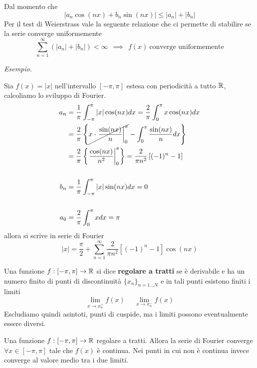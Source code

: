 \begin{rem}
Dal momento che
\begin{equation*}
| a_{n}\cos(nx) + b_{n}\sin(nx)| \leq | a_{n}| + | b_{n}|
\end{equation*}
Per il test di Weierstrass vale la seguente relazione che ci permette di stabilire se la serie converge uniformemente
\begin{equation*}
\sum\limits^{\infty}_{n = 1}(| a_{n}| + | b_{n}|) < \infty \ \ \implies \ \ f(x) \ \text{converge uniformemente}
\end{equation*}
\end{rem}
\textit{Esempio.}

Sia $f(x) = | x| $ nell'intervallo $[ - \pi, \pi]$ estesa con periodicità a tutto $\mathbb{R}$, calcoliamo lo sviluppo di Fourier.
\begin{align*}
a_{n} & = \frac{1}{\pi}\int^{\pi}_{- \pi}| x| \cos(nx) dx = \frac{2}{\pi}\int^{\pi}_{0} x\cos(nx) dx\\
 & = \frac{2}{\pi}\left\{\cancel{x \cdot \left. \frac{\sin(nx)}{n}\right|^{\pi}_{0}} - \int^{\pi}_{0}\frac{\sin(nx)}{n} dx\right\}\\
 & = \frac{2}{\pi}\left\{\left. \frac{\cos(nx)}{n^{2}}\right|^{\pi}_{0}\right\} = \frac{2}{\pi n^{2}}\left[(- 1)^{n} - 1\right]\\
 & \\
b_{n} & = \frac{1}{\pi}\int^{\pi}_{- \pi}| x| \sin(nx) dx = 0\\
 & \\
a_{0} & = \frac{2}{\pi}\int^{\pi}_{0} xdx = \pi
\end{align*}
allora si scrive in serie di Fourier
\begin{equation*}
| x| = \frac{\pi}{2} + \sum\limits^{\infty}_{n = 1}\frac{2}{\pi n^{2}}\left[(- 1)^{n} - 1\right]\cos(nx)
\end{equation*}
\begin{defn}
Una funzione $f: [ - \pi, \pi]\rightarrow \mathbb{R}$ si dice \textbf{regolare a tratti} se è derivabile e ha un numero finito di punti di discontinuità $\{x_{n}\}_{n = 1\dotsc N}$ e in tali punti esistono finiti i limiti
\begin{equation*}
\lim\limits_{x\rightarrow x^{+}_{n}} f(x) \ \ \ \ \ \ \lim\limits_{x\rightarrow x^{-}_{n}} f(x)
\end{equation*}
Escludiamo quindi asintoti, punti di cuspide, ma i limiti possono eventualmente essere diversi.
\end{defn}
\begin{thm}
Una funzione $f: [ - \pi, \pi]\rightarrow \mathbb{R}$ regolare a tratti. Allora la serie di Fourier converge $\forall x\in [ - \pi, \pi]$ tale che $f(x)$ è continua. Nei punti in cui non è continua invece converge al valore medio tra i due limiti.
\end{thm}
